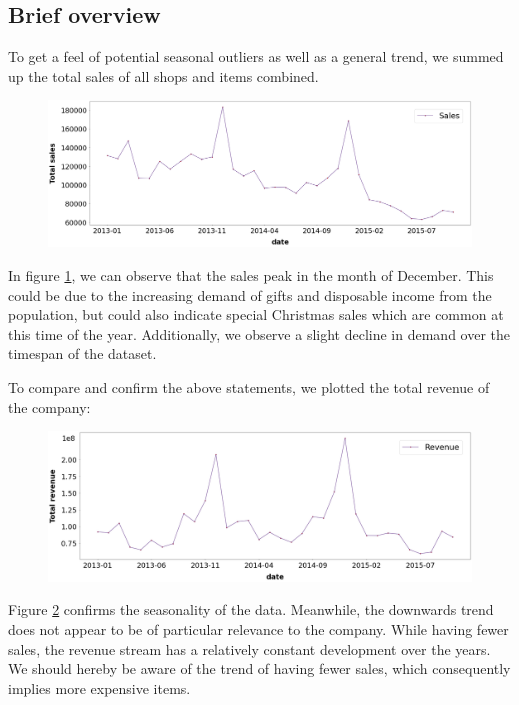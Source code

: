 \subsection{Brief overview}

To get a feel of potential seasonal outliers as well as a general trend, we summed up the total sales of all shops and items combined.

\begin{figure}[h]
  \centering
  \includegraphics[width=0.86\linewidth]{external_content/graphs/total_sales.png}
  \captionsetup{justification=centering}
  \label{fig:total_sales}
\end{figure}


In figure \ref{fig:total_sales}, we can observe that the sales peak in the month of December. This could be due to the increasing demand of gifts and disposable income from the population, but could also indicate special Christmas sales which are common at this time of the year. Additionally, we observe a slight decline in demand over the timespan of the dataset.

To compare and confirm the above statements, we plotted the total revenue of the company:

\begin{figure}[h]
  \centering
  \includegraphics[width=0.9\linewidth]{external_content/graphs/total_revenue.png}
  \captionsetup{justification=centering}
  \label{fig:total_revenue}
\end{figure}

Figure \ref{fig:total_revenue} confirms the seasonality of the data. Meanwhile, the downwards trend does not appear to be of particular relevance to the company.
While having fewer sales, the revenue stream has a relatively constant development over the years. We should hereby be aware of the trend of having fewer sales, which consequently implies more expensive items.

